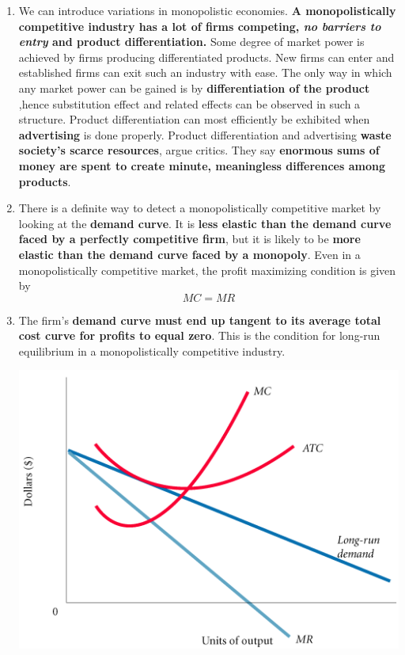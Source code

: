 \documentclass[12pt]{article}
\begin{document}
\begin{enumerate}
\item We can introduce variations in monopolistic economies. \textbf{A monopolistically competitive industry has a lot of firms competing, \textit{no barriers to entry} and product differentiation.} Some degree of market power is achieved by firms producing differentiated products.
New firms can enter and established firms can exit such an industry with ease. The only way in which any market power can be gained is by \textbf{differentiation of the product },hence substitution effect and related effects can be observed in such a structure.  Product differentiation can most efficiently be exhibited when \textbf{advertising} is done properly. Product differentiation and advertising \textbf{waste society's scarce resources}, argue critics. They say \textbf{enormous sums of money are spent to create minute, meaningless differences among products}.
\item There is a definite way to detect a monopolistically competitive market by looking at the \textbf{demand curve}. It is \textbf{less elastic than the demand curve faced by a perfectly competitive firm}, but it is likely to be \textbf{more elastic than the demand curve faced by a monopoly}. Even in a monopolistically competitive market, the profit maximizing condition is given by $$MC=MR$$
\item The firm's \textbf{demand curve must end up tangent to its average total cost curve for profits to equal zero}.  This is the condition for long-run equilibrium in a monopolistically competitive industry.
\begin{center}
\includegraphics[scale=0.5]{mcflre.png}
\end{center}
\end{enumerate}
\end{document}
